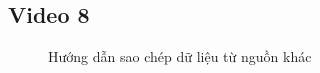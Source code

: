 \documentclass{article}
\begin{document}
\subsection{Video 8}
\begin{figure}[H]
\centering
\caption{Hướng dẫn sao chép dữ liệu từ nguồn khác}
\end{figure}







\end{document}
